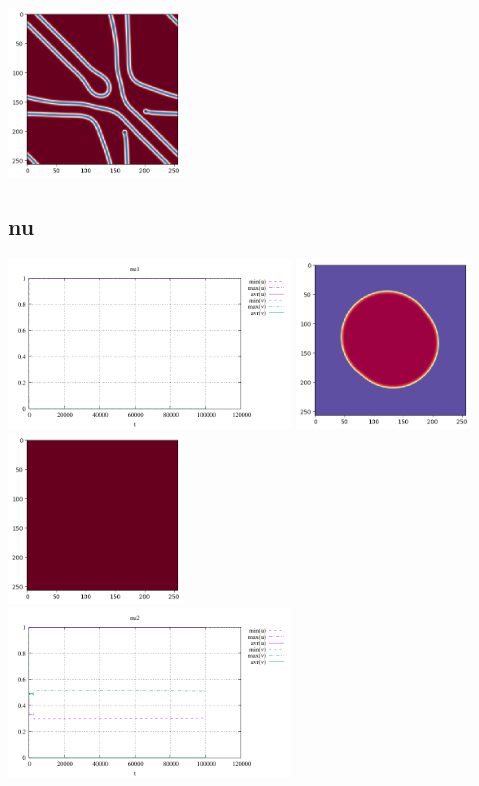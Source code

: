 \begin{center}
\includegraphics[height=4.5cm]{python_codes/fieldstone_171/results/mu2_solution_final_v.png}
\end{center}

\subsection*{nu}
\begin{center}
\includegraphics[height=4.5cm]{python_codes/fieldstone_171/results/nu1_stats}
\includegraphics[height=4.5cm]{python_codes/fieldstone_171/results/nu1_solution_final_u.png}
\includegraphics[height=4.5cm]{python_codes/fieldstone_171/results/nu1_solution_final_v.png}\\
\includegraphics[height=4.5cm]{python_codes/fieldstone_171/results/nu2_stats}

\end{center}
